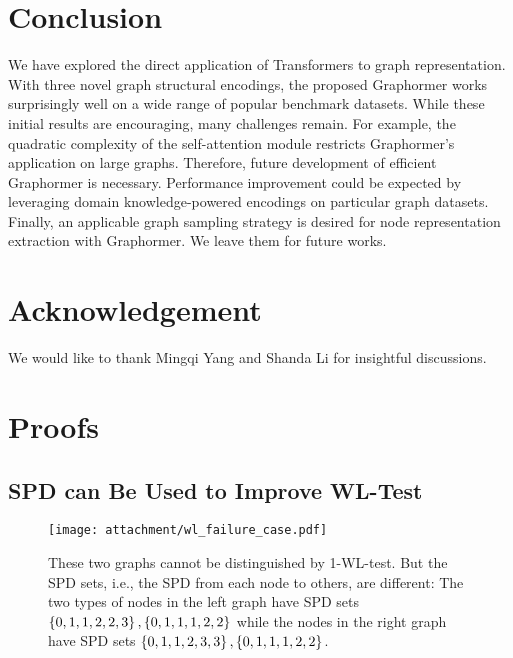 \documentclass{article}
\begin{document}
\section{Conclusion}\label{conclusion}
We have explored the direct application of Transformers to graph representation. With three novel graph structural encodings, the proposed Graphormer works surprisingly well on a wide range of popular benchmark datasets. While these initial results are encouraging, many challenges remain. For example, the quadratic complexity of the self-attention module restricts Graphormer's application on large graphs. Therefore, future development of efficient Graphormer is necessary. Performance improvement could be expected by leveraging domain knowledge-powered encodings on particular graph datasets. Finally, an applicable graph sampling strategy is desired for node representation extraction with Graphormer. We leave them for future works.

\section{Acknowledgement}
We would like to thank Mingqi Yang and Shanda Li for insightful discussions. 



\small






\newpage
\appendix

\section{Proofs}\label{App:proofs}
\subsection{SPD can Be Used to Improve WL-Test}
\begin{figure}[ht]
    \centering
    \texttt{[image: attachment/wl\_failure\_case.pdf]}
    \caption{These two graphs cannot be distinguished by 1-WL-test. But the SPD sets, i.e., the SPD from each node to others, are different: The two types of nodes in the left graph have SPD sets $\left\{0, 1, 1, 2, 2, 3\right\}, \left\{0, 1, 1, 1, 2, 2\right\}$ while the nodes in the right graph have SPD sets $\left\{0, 1, 1, 2, 3, 3\right\}, \left\{0, 1, 1, 1, 2, 2\right\}$.}\label{fig:wl_fail}

\end{figure}
\end{document}
